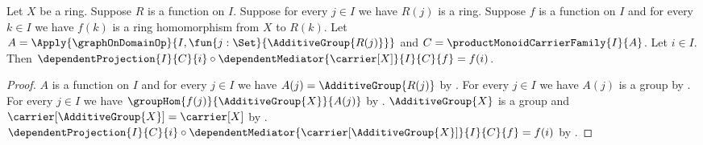 \begin{theorem}\label{product_ring_mediator_factorization}
    Let $X$ be a ring.
    Suppose $R$ is a function on $I$.
    Suppose for every $j\in I$ we have $R(j)$ is a ring.
    Suppose $f$ is a function on $I$ and for every $k\in I$ we have
        $f(k)$ is a ring homomorphism from $X$ to $R(k)$.
    Let
        $A=\Apply{\graphOnDomainOp}{
            I,\fun{j:\Set}{\AdditiveGroup{R(j)}}}$ and
        $C=\productMonoidCarrierFamily{I}{A}$.
    Let $i\in I$.
    Then
        $\dependentProjection{I}{C}{i}\circ
            \dependentMediator{\carrier[X]}{I}{C}{f}=f(i)$.
\end{theorem}
\begin{proof}
    $A$ is a function on $I$ and for every $j\in I$ we have
        $A(j)=\AdditiveGroup{R(j)}$ by
        .
    For every $j\in I$ we have $A(j)$ is a group by
        .
    For every $j\in I$ we have
        $\groupHom{f(j)}{\AdditiveGroup{X}}{A(j)}$ by
        .
    $\AdditiveGroup{X}$ is a group and
        $\carrier[\AdditiveGroup{X}]=\carrier[X]$ by
        .
    $\dependentProjection{I}{C}{i}\circ
        \dependentMediator{\carrier[\AdditiveGroup{X}]}{I}{C}{f}
            =f(i)$ by
        .
\end{proof}

